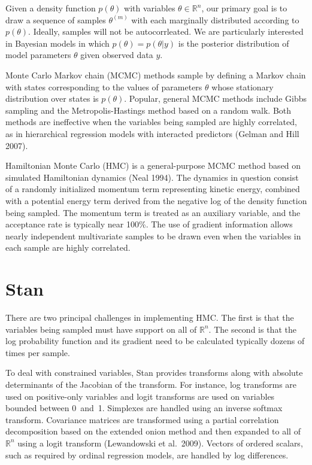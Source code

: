 \documentclass[twoside,11pt]{article}
\begin{document}
Given a density function $p(\theta)$ with variables $\theta \in
{\mathbb R}^n$, our primary goal is to draw a sequence of samples
$\theta^{(m)}$ with each marginally distributed according to
$p(\theta)$.  Ideally, samples will not be autocorrleated.  We are
particularly interested in Bayesian models in which $p(\theta) =
p(\theta|y)$ is the posterior distribution of model parameters
$\theta$ given observed data $y$.  

Monte Carlo Markov chain (MCMC) methods sample by defining a Markov
chain with states corresponding to the values of parameters $\theta$
whose stationary distribution over states is $p(\theta)$.  Popular,
general MCMC methods include Gibbs sampling and the
Metropolis-Hastings method based on a random walk.  Both methods are
ineffective when the variables being sampled are highly correlated, as
in hierarchical regression models with interacted predictors (Gelman
and Hill 2007).

Hamiltonian Monte Carlo (HMC) is a general-purpose MCMC method based
on simulated Hamiltonian dynamics (Neal 1994).  The dynamics in
question consist of a randomly initialized momentum term representing
kinetic energy, combined with a potential energy term derived from the
negative log of the density function being sampled.  The momentum term
is treated as an auxiliary variable, and the acceptance rate is
typically near 100\%.  The use of gradient information allows nearly
independent multivariate samples to be drawn even when the variables
in each sample are highly correlated.

\section{Stan}

There are two principal challenges in implementing HMC.  The first is
that the variables being sampled must have support on all of ${\mathbb
R}^n$.  The second is that the log probability function and its
gradient need to be calculated typically dozens of times per sample.

To deal with constrained variables, Stan provides transforms along
with absolute determinants of the Jacobian of the transform.  For
instance, log transforms are used on positive-only variables and logit
transforms are used on variables bounded between 0~and~1.  Simplexes
are handled using an inverse softmax transform.  Covariance matrices
are transformed using a partial correlation decomposition based on the
extended onion method and then expanded to all of ${\mathbb R}^n$
using a logit transform (Lewandowski et al.~2009).  Vectors of ordered
scalars, such as required by ordinal regression models, are handled by
log differences.
\end{document}
